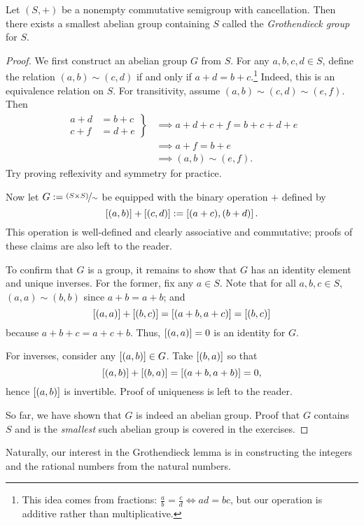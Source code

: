 \documentclass[master.tex]{subfiles}
\begin{document}
    \begin{lemma}[title=Grothendieck lemma, label=grothendieck-lemma]
        Let $(S, +)$ be a nonempty commutative semigroup with cancellation.
        Then there exists a smallest abelian group containing $S$ called the \emph{Grothendieck group} for $S$.
        \tcblower
        \begin{proof}
            We first construct an abelian group $G$ from $S$.
            For any $a, b, c, d \in S$, define the relation $(a, b) \sim (c, d)$ if and only if $a + d = b + c$.\footnote{
                This idea comes from fractions: $\frac{a}{b} = \frac{c}{d} \iff ad = bc$, but our operation is additive rather than multiplicative.
            }
            Indeed, this is an equivalence relation on $S$.
            For transitivity, assume $(a, b) \sim (c, d) \sim (e, f)$.
            Then
            \begin{align*}
                \left.\begin{aligned}
                    a + d &= b + c \\
                    c + f &= d + e
                \end{aligned}\right\}
                &\implies a + d + c + f = b + c + d + e \\
                &\implies a + f = b + e \\
                &\implies (a, b) \sim (e, f).
            \end{align*}
            Try proving reflexivity and symmetry for practice.

            Now let $G := \nicefrac{(S \times S)}{\sim}$ be equipped with the binary operation $+$ defined by
            \[
                \left[ (a, b) \right] + \left[ (c, d) \right] := \left[ (a + c), (b + d) \right]
            .\]
            This operation is well-defined and clearly associative and commutative; proofs of these claims are also left to the reader.

            To confirm that $G$ is a group, it remains to show that $G$ has an identity element and unique inverses.
            For the former, fix any $a \in S$.
            Note that for all $a, b, c \in S$, $(a, a) \sim (b, b)$ since $a + b = a + b$; and
            \[
                \left[ (a, a) \right] + \left[ (b, c) \right] = \left[ (a + b, a + c) \right] = \left[ (b, c) \right]  
            \]
            because $a + b + c = a + c + b$.
            Thus, $\left[ (a, a) \right] = 0$ is an identity for $G$.

            For inverses, consider any $\left[ (a, b) \right] \in G$.
            Take $\left[ (b, a) \right]$ so that
            \[
                \left[ (a, b) \right] + \left[ (b, a) \right] = \left[ (a + b, a + b) \right] = 0
            ,\]
            hence $\left[ (a, b) \right]$ is invertible.
            Proof of uniqueness is left to the reader.

            So far, we have shown that $G$ is indeed an abelian group.
            Proof that $G$ contains $S$ and is the \emph{smallest} such abelian group is covered in the exercises.
        \end{proof}
    \end{lemma}

    Naturally, our interest in the Grothendieck lemma is in constructing the integers and the rational numbers from the natural numbers.
\end{document}
